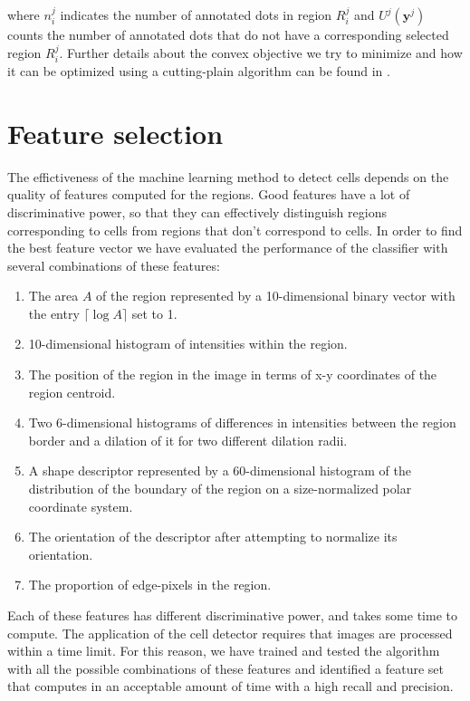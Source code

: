 	\noindent where $n_i^j$ indicates the number of annotated dots in region $R_i^j$ and $U^j(\textbf{y}^j)$ counts the number of annotated dots that do not have a corresponding selected region $R_i^j$. Further details about the convex objective we try to minimize and how it can be optimized using a cutting-plain algorithm can be found in \cite{arteta12}.
		
	\section{Feature selection \statusfirstdraft}
	\label{sec:detector_feature}
	
	The effictiveness of the machine learning method to detect cells depends on the quality of features computed for the regions. Good features have a lot of discriminative power, so that they can effectively distinguish regions corresponding to cells from regions that don't correspond to cells. In order to find the best feature vector we have evaluated the performance of the classifier with several combinations of these features:
	
	\begin{enumerate}
	    \item The area $A$ of the region represented by a 10-dimensional binary vector with the entry $\lceil \log A \rceil $ set to 1.
		\item 10-dimensional histogram of intensities within the region.
	    \item The position of the region in the image in terms of x-y coordinates of the region centroid.
	    \item Two 6-dimensional histograms of differences in intensities between the region border and a dilation of it for two different dilation radii.
	    \item A shape descriptor represented by a 60-dimensional histogram of the distribution of the boundary of the region on a size-normalized polar coordinate system.
	    \item The orientation of the descriptor after attempting to normalize its orientation.
	    \item The proportion of edge-pixels in the region.
	\end{enumerate}
	
	Each of these features has different discriminative power, and takes some time to compute. The application of the cell detector requires that images are processed within a time limit. For this reason, we have trained and tested the algorithm with all the possible combinations of these features and identified a feature set that computes in an acceptable amount of time with a high recall and precision.
	
